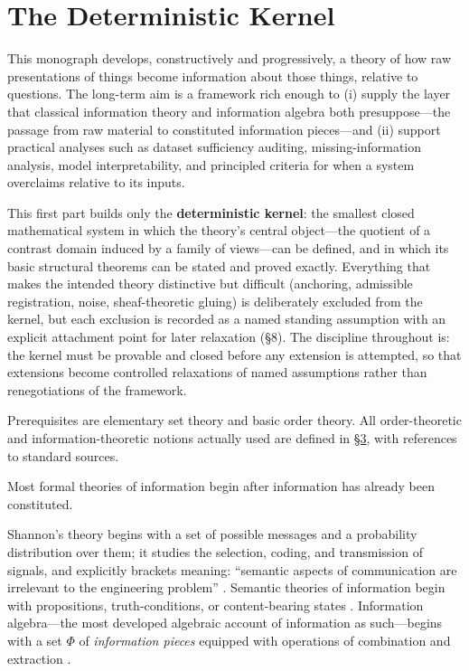 \part{The Deterministic Kernel}


This monograph develops, constructively and progressively, a theory of how raw presentations of things become information about those things, relative to questions. The long-term aim is a framework rich enough to (i) supply the layer that classical information theory and information algebra both presuppose---\hspace{0pt}the passage from raw material to constituted information pieces---\hspace{0pt}and (ii) support practical analyses such as dataset sufficiency auditing, missing-information analysis, model interpretability, and principled criteria for when a system overclaims relative to its inputs.

This first part builds only the \textbf{deterministic kernel}: the smallest closed mathematical system in which the theory's central object---\hspace{0pt}the quotient of a contrast domain induced by a family of views---\hspace{0pt}can be defined, and in which its basic structural theorems can be stated and proved exactly. Everything that makes the intended theory distinctive but difficult (anchoring, admissible registration, noise, sheaf-theoretic gluing) is deliberately excluded from the kernel, but each exclusion is recorded as a named standing assumption with an explicit attachment point for later relaxation (§8). The discipline throughout is: the kernel must be provable and closed before any extension is attempted, so that extensions become controlled relaxations of named assumptions rather than renegotiations of the framework.

Prerequisites are elementary set theory and basic order theory. All order-theoretic and information-theoretic notions actually used are defined in \hyperlink{sec:3}{§3}, with references to standard sources.


Most formal theories of information begin after information has already been constituted.

Shannon's theory begins with a set of possible messages and a probability distribution over them; it studies the selection, coding, and transmission of signals, and explicitly brackets meaning: ``semantic aspects of communication are irrelevant to the engineering problem'' \autocite{shannon1948}. Semantic theories of information begin with propositions, truth-conditions, or content-bearing states \autocite{barhillel1952,dretske1981,floridi2004}. Information algebra---\hspace{0pt}the most developed algebraic account of information as such---\hspace{0pt}begins with a set \(\Phi\) of \emph{information pieces} equipped with operations of combination and extraction \autocite{kohlas2003}.

